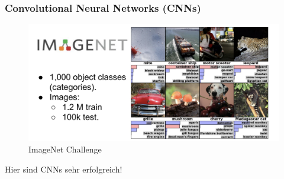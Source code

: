 \documentclass{beamer}
\begin{document}
\begin{frame}
  \frametitle{Convolutional Neural Networks (CNNs)}
  \begin{figure}
    \centering
    \includegraphics[width=\textwidth]{img/imagenet.png}
    \caption*{ImageNet Challenge \cite{Giro-o-Nieto}}
  \end{figure}
  Hier sind CNNs sehr erfolgreich!
\end{frame}
\end{document}
